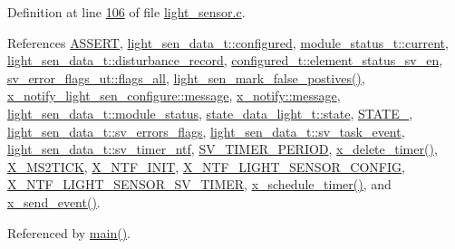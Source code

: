 Definition at line \hyperlink{a00047_source_l00106}{106} of file \hyperlink{a00047_source}{light\+\_\+sensor.\+c}.



References \hyperlink{a00072_source_l00059}{A\+S\+S\+E\+R\+T}, \hyperlink{a00024_source_l00041}{light\+\_\+sen\+\_\+data\+\_\+t\+::configured}, \hyperlink{a00017_source_l00156}{module\+\_\+status\+\_\+t\+::current}, \hyperlink{a00024_source_l00046}{light\+\_\+sen\+\_\+data\+\_\+t\+::disturbance\+\_\+record}, \hyperlink{a00021_source_l00205}{configured\+\_\+t\+::element\+\_\+status\+\_\+sv\+\_\+en}, \hyperlink{a00022_source_l00044}{sv\+\_\+error\+\_\+flags\+\_\+ut\+::flags\+\_\+all}, \hyperlink{a00047_source_l00491}{light\+\_\+sen\+\_\+mark\+\_\+false\+\_\+postives()}, \hyperlink{a00018_a32952acc732e2f16aad59fe0804da5bf}{x\+\_\+notify\+\_\+light\+\_\+sen\+\_\+configure\+::message}, \hyperlink{a00036_source_l00075}{x\+\_\+notify\+::message}, \hyperlink{a00024_source_l00050}{light\+\_\+sen\+\_\+data\+\_\+t\+::module\+\_\+status}, \hyperlink{a00017_source_l00150}{state\+\_\+data\+\_\+light\+\_\+t\+::state}, \hyperlink{a00021_source_l00149}{S\+T\+A\+T\+E\+\_}, \hyperlink{a00024_source_l00056}{light\+\_\+sen\+\_\+data\+\_\+t\+::sv\+\_\+errors\+\_\+flags}, \hyperlink{a00024_source_l00034}{light\+\_\+sen\+\_\+data\+\_\+t\+::sv\+\_\+task\+\_\+event}, \hyperlink{a00024_source_l00037}{light\+\_\+sen\+\_\+data\+\_\+t\+::sv\+\_\+timer\+\_\+ntf}, \hyperlink{a00023_source_l00020}{S\+V\+\_\+\+T\+I\+M\+E\+R\+\_\+\+P\+E\+R\+I\+O\+D}, \hyperlink{a00037_source_l00482}{x\+\_\+delete\+\_\+timer()}, \hyperlink{a00036_source_l00048}{X\+\_\+\+M\+S2\+T\+I\+C\+K}, \hyperlink{a00036_source_l00030}{X\+\_\+\+N\+T\+F\+\_\+\+I\+N\+I\+T}, \hyperlink{a00018_source_l00013}{X\+\_\+\+N\+T\+F\+\_\+\+L\+I\+G\+H\+T\+\_\+\+S\+E\+N\+S\+O\+R\+\_\+\+C\+O\+N\+F\+I\+G}, \hyperlink{a00024_source_l00015}{X\+\_\+\+N\+T\+F\+\_\+\+L\+I\+G\+H\+T\+\_\+\+S\+E\+N\+S\+O\+R\+\_\+\+S\+V\+\_\+\+T\+I\+M\+E\+R}, \hyperlink{a00037_source_l00456}{x\+\_\+schedule\+\_\+timer()}, and \hyperlink{a00037_source_l00381}{x\+\_\+send\+\_\+event()}.



Referenced by \hyperlink{a00048_source_l00080}{main()}.


